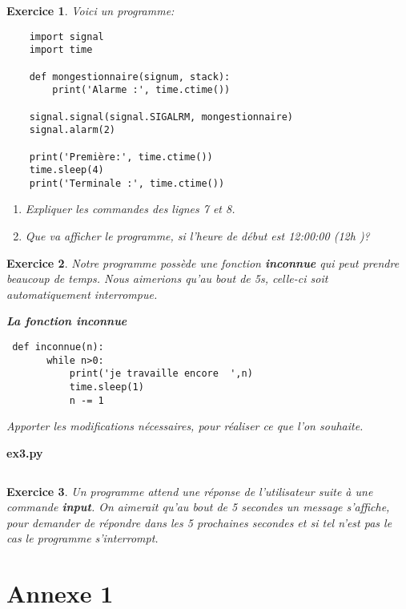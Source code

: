 \documentclass[10pt,french,A4]{article}
\theoremstyle{plain}
\newtheorem{exercice}{Exercice}
\newenvironment{code}[1]{%
    \begin{bclogo}[couleur=backcolour, couleurTexte=black ,couleurBord=blue ,couleurBarre=black, ombre=false,epBord=0.9,logo=\#,arrondi=0.1]{{\bfseries #1}}%
    }%
    {%
    \end{bclogo}
}%
\begin{document}
\begin{exercice}
    Voici un programme:
        \begin{verbatim}
    import signal
    import time
    
    def mongestionnaire(signum, stack):
        print('Alarme :', time.ctime())
       
    signal.signal(signal.SIGALRM, mongestionnaire)
    signal.alarm(2)
    
    print('Première:', time.ctime())
    time.sleep(4)
    print('Terminale :', time.ctime())
   \end{verbatim}
   
   \begin{enumerate}
       \item Expliquer les commandes des lignes 7 et 8.
       \item Que va afficher le programme, si l'heure de début est 12:00:00 (12h )?
   \end{enumerate}
\end{exercice}

\begin{exercice}
   Notre programme possède une fonction \textbf{inconnue} qui peut prendre beaucoup de temps. Nous aimerions qu'au bout de 5s, celle-ci soit automatiquement interrompue.
   \begin{code}{La fonction inconnue}
        \begin{verbatim}
 def inconnue(n):
       while n>0:
           print('je travaille encore  ',n)
           time.sleep(1)
           n -= 1
       \end{verbatim}
   \end{code}
Apporter les modifications nécessaires, pour réaliser ce que l'on souhaite.
\end{exercice}

\ifProf
\begin{code}{ex3.py}
    \inputminted{Python}{ex3.py}
\end{code}
\fi
\begin{exercice}
   Un programme attend une réponse de l'utilisateur suite à une commande \textbf{input}. On aimerait qu'au bout de 5 secondes un message s'affiche, pour demander de répondre dans les 5 prochaines secondes et si tel n'est pas le cas le programme s'interrompt.
   

\end{exercice}
\newpage
\section*{Annexe 1}
\end{document}
